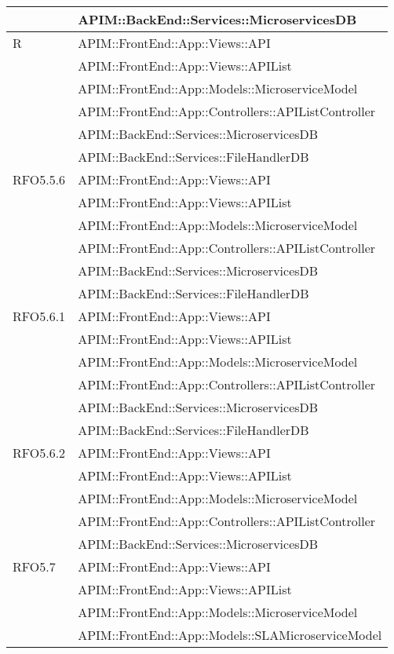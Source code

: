 \begin{longtable}{ p{4cm} | p{12cm} }
			& APIM::BackEnd::Services::MicroservicesDB \\
			\hline		
			R
			& APIM::FrontEnd::App::Views::API \\
			& APIM::FrontEnd::App::Views::APIList \\
			& APIM::FrontEnd::App::Models::MicroserviceModel \\
			& APIM::FrontEnd::App::Controllers::APIListController \\
			& APIM::BackEnd::Services::MicroservicesDB \\
			& APIM::BackEnd::Services::FileHandlerDB \\
			\hline		
			RFO5.5.6
			& APIM::FrontEnd::App::Views::API \\
			& APIM::FrontEnd::App::Views::APIList \\
			& APIM::FrontEnd::App::Models::MicroserviceModel \\
			& APIM::FrontEnd::App::Controllers::APIListController \\
			& APIM::BackEnd::Services::MicroservicesDB \\
			& APIM::BackEnd::Services::FileHandlerDB \\
			\hline		
			RFO5.6.1
			& APIM::FrontEnd::App::Views::API \\
			& APIM::FrontEnd::App::Views::APIList \\
			& APIM::FrontEnd::App::Models::MicroserviceModel \\
			& APIM::FrontEnd::App::Controllers::APIListController \\
			& APIM::BackEnd::Services::MicroservicesDB \\
			& APIM::BackEnd::Services::FileHandlerDB \\
			\hline	
			RFO5.6.2
			& APIM::FrontEnd::App::Views::API \\
			& APIM::FrontEnd::App::Views::APIList \\
			& APIM::FrontEnd::App::Models::MicroserviceModel \\
			& APIM::FrontEnd::App::Controllers::APIListController \\
			& APIM::BackEnd::Services::MicroservicesDB \\
			\hline	
			RFO5.7
			& APIM::FrontEnd::App::Views::API \\
			& APIM::FrontEnd::App::Views::APIList \\
			& APIM::FrontEnd::App::Models::MicroserviceModel \\
			& APIM::FrontEnd::App::Models::SLAMicroserviceModel \\

\end{longtable}
